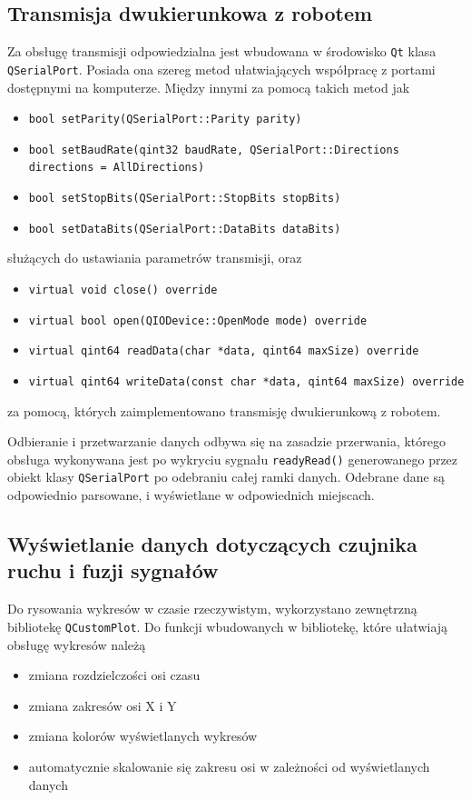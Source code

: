 \subsection{Transmisja dwukierunkowa z robotem}

Za obsługę transmisji odpowiedzialna jest wbudowana w środowisko \texttt{Qt} klasa \texttt{QSerialPort}. Posiada ona szereg metod ułatwiających współpracę z portami dostępnymi na komputerze. Między innymi za pomocą takich metod jak
\begin{itemize}
    \item \texttt{bool setParity(QSerialPort::Parity parity)}
    \item \texttt{bool setBaudRate(qint32 baudRate, QSerialPort::Directions directions = AllDirections)}
    \item \texttt{bool setStopBits(QSerialPort::StopBits stopBits)}
    \item \texttt{bool setDataBits(QSerialPort::DataBits dataBits)}
\end{itemize}
służących do ustawiania parametrów transmisji, oraz
\begin{itemize}
    \item \texttt{virtual void close() override}
    \item \texttt{virtual bool open(QIODevice::OpenMode mode) override}
    \item \texttt{virtual qint64 readData(char *data, qint64 maxSize) override}
    \item \texttt{virtual qint64 writeData(const char *data, qint64 maxSize) override}
\end{itemize}
za pomocą, których zaimplementowano transmisję dwukierunkową z robotem.

Odbieranie i przetwarzanie danych odbywa się na zasadzie przerwania, którego obsługa wykonywana jest po wykryciu sygnału \texttt{readyRead()} generowanego przez obiekt klasy \texttt{QSerialPort} po odebraniu całej ramki danych. Odebrane dane są odpowiednio parsowane, i wyświetlane w odpowiednich miejscach.

\subsection{Wyświetlanie danych dotyczących czujnika ruchu i fuzji sygnałów}

Do rysowania wykresów w czasie rzeczywistym, wykorzystano zewnętrzną bibliotekę \texttt{QCustomPlot}. Do funkcji wbudowanych w bibliotekę, które ułatwiają obsługę wykresów należą
\begin{itemize}
    \item zmiana rozdzielczości osi czasu
    \item zmiana zakresów osi X i Y
    \item zmiana kolorów wyświetlanych wykresów
    \item automatycznie skalowanie się zakresu osi w zależności od wyświetlanych danych
\end{itemize}

